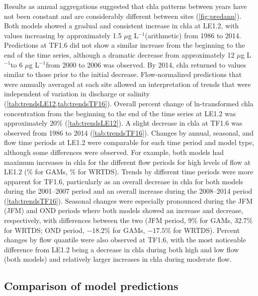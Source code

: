 \documentclass{svjour3}\usepackage[]{graphicx}\usepackage[]{color}
\newcommand{\mugl}{$\mu$g L$^{-1}$}
\begin{document}
Results as annual aggregations suggested that \ac{chla} patterns between years have not been constant and are considerably different between sites (\cref{fig:predann}).  Both models showed a gradual and consistent increase in \ac{chla} at LE1.2, with values increasing by approximately 1.5 \mugl (arithmetic) from 1986 to 2014.  Predictions at TF1.6 did not show a similar increase from the beginning to the end of the time series, although a dramatic decrease from approximately 12 \mugl to 6 \mugl from 2000 to 2006 was observed. By 2014, \ac{chla} returned to values similar to those prior to the initial decrease.  Flow-normalized predictions that were annually averaged at each site allowed an interpretation of trends that were independent of variation in discharge or salinity (\cref{tab:trendsLE12,tab:trendsTF16}).  Overall percent change of ln-transformed \ac{chla} concentration from the beginning to the end of the time series at LE1.2 was approximately 20\% (\cref{tab:trendsLE12}).  A slight decrease in \ac{chla} at TF1.6 was observed from 1986 to 2014 (\cref{tab:trendsTF16}).  Changes by annual, seasonal, and flow time periods at LE1.2 were comparable for each time period and model type, although some differences were observed.  For example, both models had maximum increases in \ac{chla} for the different flow periods for high levels of flow at LE1.2 (\% for \acp{GAM}, \% for \ac{WRTDS}).  Trends by different time periods were more apparent for TF1.6, particularly as an overall decrease in \ac{chla} for both models during the 2001--2007 period and an overall increase during the 2008--2014 period (\cref{tab:trendsTF16}).  Seasonal changes were especially pronounced during the \acl{JFM} (\acs{JFM}) and \ac{OND} periods where both models showed an increase and decrease, respectively, with differences between the two (\ac{JFM} period, 9\% for \acp{GAM}, 32.7\% for \ac{WRTDS}; \ac{OND} period, \ensuremath{-18.2}\% for \acp{GAM}, \ensuremath{-17.5}\% for \ac{WRTDS}).  Percent changes by flow quantile were also observed at TF1.6, with the most noticeable difference from LE1.2 being a decrease in \ac{chla} during both high and low flow (both models) and relatively larger increases in \ac{chla} during moderate flow.  

\subsection{Comparison of model predictions}
\end{document}

